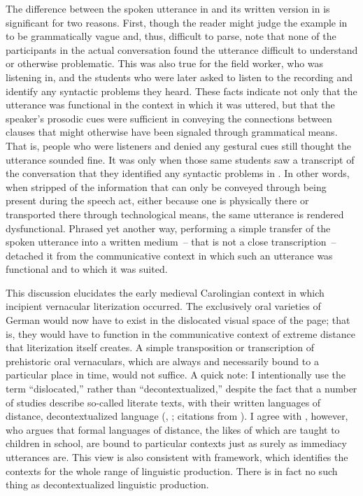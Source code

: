   The difference between the spoken utterance in  and its written version in  is significant for two reasons. First, though the reader might judge the example in  to be grammatically vague and, thus, difficult to parse, \citet[60]{MillerWeinert1998} note that none of the participants in the actual conversation found the utterance difficult to understand or otherwise problematic. This was also true for the field worker, who was listening in, and the students who were later asked to listen to the recording and identify any syntactic problems they heard. These facts indicate not only that the utterance was functional in the context in which it was uttered, but that the speaker’s prosodic cues were sufficient in conveying the connections between clauses that might otherwise have been signaled through grammatical means. That is, people who were listeners and denied any gestural cues still thought the utterance sounded fine. It was only when those same students saw a transcript of the conversation that they identified any syntactic problems in . In other words, when stripped of the information that can only be conveyed through being present during the speech act, either because one is physically there or transported there through technological means, the same utterance is rendered dysfunctional. Phrased yet another way, performing a simple transfer of the spoken utterance into a written medium~-- that is not a close transcription~-- detached it from the communicative context in which such an utterance was functional and to which it was suited.

This discussion elucidates the early medieval Carolingian context in which incipient vernacular literization occurred. The exclusively oral varieties of German would now have to exist in the dislocated visual space of the page; that is, they would have to function in the communicative context of extreme distance that literization itself creates. A simple transposition or transcription of prehistoric oral vernaculars, which are always and necessarily bound to a particular place in time, would not suffice. A quick note: I intentionally use the term “dislocated,” rather than “decontextualized,” despite the fact that a number of studies describe so-called literate texts, with their written languages of distance, decontextualized language (\citealt{GumperzEtAl1984,MichaelsCazden1986,MichaelsCollins1984,Olson1977,Olson1980}, \citealt{ScollonScollon1981,Snow1983,TorranceOlson1984}; citations from \citealt{Schleppegrell2004}). I agree with \citet[6--7]{Schleppegrell2004}, however, who argues that formal languages of distance, the likes of which are taught to children in school, are bound to particular contexts just as surely as immediacy utterances are. This view is also consistent with  framework, which identifies the contexts for the whole range of linguistic production. There is in fact no such thing as decontextualized linguistic production.


